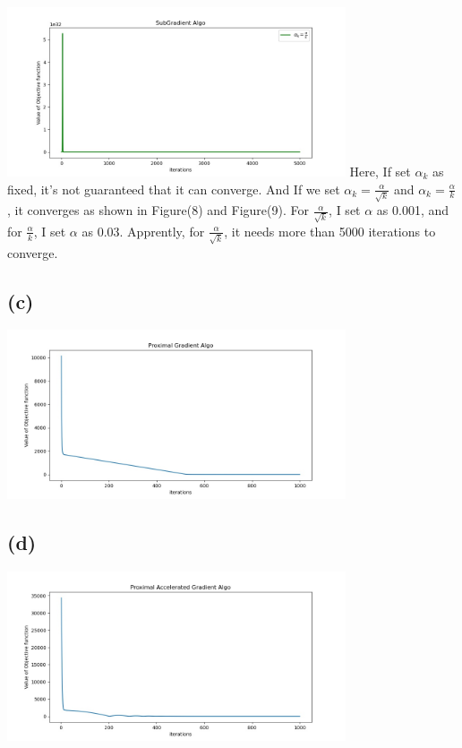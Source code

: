 \documentclass[12pt, a4 paper]{article}
\begin{document}
\begin{framed}
        {\centering
        \includegraphics[width=10cm, height=5cm]{Q10_2_2.jpg}
        }
        Here, If set $\alpha_{k}$ as fixed, it's not guaranteed that it can 
        converge. And If we set $\alpha_{k}=\frac{\alpha}{\sqrt{k}}$ and $\alpha_{k}
        =\frac{\alpha}{k}$, it converges as shown in Figure(8) and Figure(9).
        For $\frac{\alpha}{\sqrt{k}}$, I set $\alpha$ as 0.001, and for 
        $\frac{\alpha}{k}$, I set $\alpha$ as 0.03. Apprently, for 
        $\frac{\alpha}{\sqrt{k}}$, it needs more than 5000 iterations to
        converge.

        \subsection{(c)}
        {\centering
        \includegraphics[width=10cm, height=5cm]{Q10_3.jpg}
        }

        \subsection{(d)}
        {\centering
        \includegraphics[width=10cm, height=5cm]{Q10_4.jpg}
        }
    \end{framed}
\end{document}

